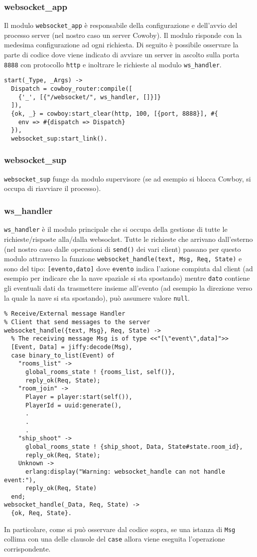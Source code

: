\documentclass[paper=a4, fontsize=11pt]{scrartcl} %
\numberwithin{equation}{section} %
\numberwithin{figure}{section} %
\numberwithin{table}{section} %
\begin{document}
\subsubsection{websocket\_app}
Il modulo \texttt{websocket\_app} è responsabile della configurazione e dell'avvio del processo server (nel nostro caso un server Cowoby). Il modulo risponde con la medesima configurazione ad ogni richiesta.
Di seguito è possibile osservare la parte di codice dove viene indicato di avviare un server in ascolto sulla porta \texttt{8888} con protocollo \texttt{http} e inoltrare le richieste al modulo \texttt{ws\_handler}.

\lstset{language=erlang}
\begin{lstlisting}
start(_Type, _Args) ->
  Dispatch = cowboy_router:compile([
    {'_', [{"/websocket/", ws_handler, []}]}
  ]),
  {ok, _} = cowboy:start_clear(http, 100, [{port, 8888}], #{
    env => #{dispatch => Dispatch}
  }),
  websocket_sup:start_link().
\end{lstlisting}

\subsubsection{websocket\_sup}
\texttt{websocket\_sup} funge da modulo supervisore (se ad esempio si blocca Cowboy, si occupa di riavviare il processo).
\subsubsection{ws\_handler}
\texttt{ws\_handler} è il modulo principale che si occupa della gestione di tutte le richieste/risposte alla/dalla websocket. Tutte le richieste che arrivano dall'esterno (nel nostro caso dalle operazioni di \texttt{send()} dei vari client) passano per questo modulo attraverso la funzione \texttt{websocket\_handle({text, Msg}, Req, State)} e sono del tipo: \texttt{[evento,dato]} dove \texttt{evento} indica l'azione compiuta dal client (ad esempio per indicare che la nave spaziale si sta spostando) mentre \texttt{dato} contiene gli eventuali dati da trasmettere insieme all'evento (ad esempio la direzione verso la quale la nave si sta spostando), può assumere valore \texttt{null}.
\begin{lstlisting}
% Receive/External message Handler
% Client that send messages to the server
websocket_handle({text, Msg}, Req, State) ->
  % The receiving message Msg is of type <<"[\"event\",data]">>
  [Event, Data] = jiffy:decode(Msg),
  case binary_to_list(Event) of
    "rooms_list" ->
      global_rooms_state ! {rooms_list, self()},
      reply_ok(Req, State);
    "room_join" ->
      Player = player:start(self()),
      PlayerId = uuid:generate(),
	  .
	  .
	  .
    "ship_shoot" ->
      global_rooms_state ! {ship_shoot, Data, State#state.room_id},
      reply_ok(Req, State);
    Unknown ->
      erlang:display("Warning: websocket_handle can not handle event:"),
      reply_ok(Req, State)
  end;
websocket_handle(_Data, Req, State) ->
  {ok, Req, State}.
\end{lstlisting}
In particolare, come si può osservare dal codice sopra, se una istanza di \texttt{Msg} collima con una delle clausole del \texttt{case} allora viene eseguita l'operazione corrispondente.
\end{document}
